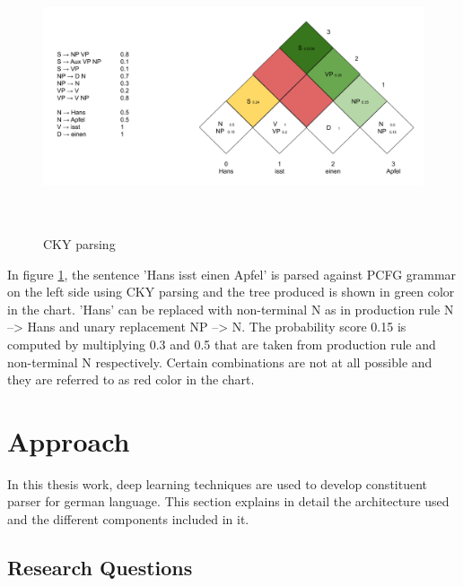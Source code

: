 \documentclass[a4paper, 11pt]{article}
\begin{document}
\begin{figure}[H]
    \centering
    \includegraphics[width=\textwidth,height=8cm,keepaspectratio=true]
    {cky-parsing-chart-2.png}
    \caption{
        CKY parsing
    }
    \label{fig:cky_parser_2}
\end{figure}

In figure \ref{fig:cky_parser_2}, the sentence 'Hans isst einen Apfel' is parsed against PCFG grammar on the left side using CKY parsing and the tree produced is shown in green color in the chart. 'Hans' can be replaced with non-terminal N as in production rule N --> Hans and unary replacement NP --> N. The probability score 0.15 is computed by multiplying 0.3 and 0.5 that are taken from production rule and non-terminal N respectively. Certain combinations are not at all possible and they are referred to as red color in the chart. 


\pagebreak
\section{Approach}  

In this thesis work, deep learning techniques are used to develop constituent parser for german language. This section explains in detail the architecture used and the different components included in it. 

\subsection{Research Questions}
\end{document}

